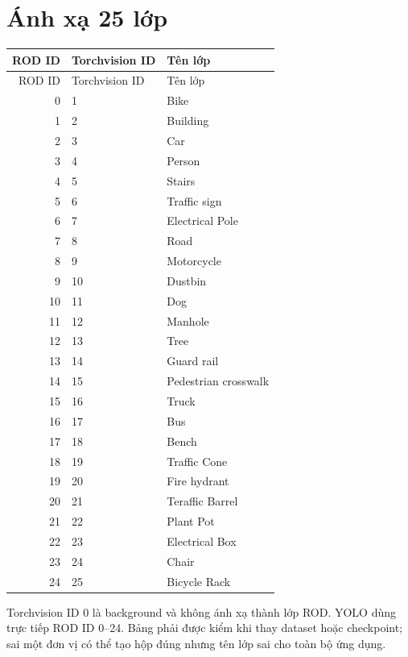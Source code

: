 \documentclass[12pt,a4paper,oneside]{report}
\begin{document}
\section{Ánh xạ 25 lớp}
\begin{longtable}{rll}
\toprule ROD ID & Torchvision ID & Tên lớp\\\midrule\endfirsthead
\toprule ROD ID & Torchvision ID & Tên lớp\\\midrule\endhead
0&1&Bike\\1&2&Building\\2&3&Car\\3&4&Person\\4&5&Stairs\\
5&6&Traffic sign\\6&7&Electrical Pole\\7&8&Road\\8&9&Motorcycle\\9&10&Dustbin\\
10&11&Dog\\11&12&Manhole\\12&13&Tree\\13&14&Guard rail\\14&15&Pedestrian crosswalk\\
15&16&Truck\\16&17&Bus\\17&18&Bench\\18&19&Traffic Cone\\19&20&Fire hydrant\\
20&21&Teraffic Barrel\\21&22&Plant Pot\\22&23&Electrical Box\\23&24&Chair\\24&25&Bicycle Rack\\\bottomrule
\end{longtable}

Torchvision ID 0 là background và không ánh xạ thành lớp ROD. YOLO dùng trực tiếp ROD ID 0--24. Bảng phải được kiểm khi thay dataset hoặc checkpoint; sai một đơn vị có thể tạo hộp đúng nhưng tên lớp sai cho toàn bộ ứng dụng.

\end{document}
